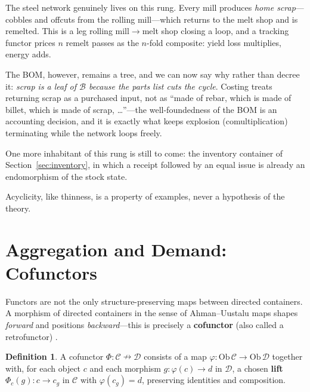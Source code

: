 \documentclass[11pt,a4paper]{article}
\newcommand{\B}{\mathcal{B}}
\theoremstyle{plain}
\theoremstyle{definition}
\newtheorem{definition}[theorem]{Definition}
\theoremstyle{remark}
\begin{document}
The steel network genuinely lives on this rung. Every mill produces
\emph{home scrap}---cobbles and offcuts from the rolling
mill---which returns to the melt shop and is remelted. This is a
leg rolling mill${}\to{}$melt shop closing a loop, and a tracking
functor prices $n$ remelt passes as the $n$-fold composite: yield
loss multiplies, energy adds.

The BOM, however, remains a tree, and we can now say why rather
than decree it: \emph{scrap is a leaf of $\B$ because the parts
list cuts the cycle}. Costing treats returning scrap as a purchased
input, not as ``made of rebar, which is made of billet, which is
made of scrap, \dots''---the well-foundedness of the BOM is an
accounting decision, and it is exactly what keeps explosion
(comultiplication) terminating while the network loops freely.

One more inhabitant of this rung is still to come: the inventory
container of Section~\ref{sec:inventory}, in which a receipt
followed by an equal issue is already an endomorphism of the stock
state.

Acyclicity, like thinness, is a property of examples, never a
hypothesis of the theory.

\section{Aggregation and Demand: Cofunctors}\label{sec:cofunctors}

Functors are not the only structure-preserving maps between directed
containers. A morphism of directed containers in the sense of
Ahman--Uustalu maps shapes \emph{forward} and positions
\emph{backward}---this is precisely a \textbf{cofunctor} (also called
a retrofunctor) \cite{aguiar, clarke-di-meglio}.

\begin{definition}
A cofunctor $\Phi : \mathcal{C} \nrightarrow \mathcal{D}$ consists of
a map $\varphi : \mathrm{Ob}\,\mathcal{C} \to \mathrm{Ob}\,\mathcal{D}$
together with, for each object $c$ and each morphism
$g : \varphi(c) \to d$ in $\mathcal{D}$, a chosen \textbf{lift}
$\Phi_c(g) : c \to c_g$ in $\mathcal{C}$ with $\varphi(c_g) = d$,
preserving identities and composition.
\end{definition}
\end{document}
